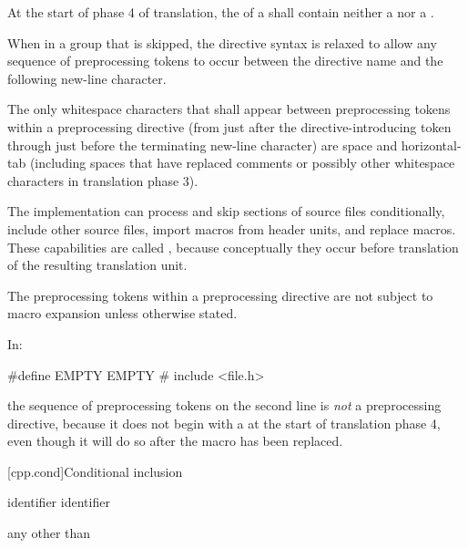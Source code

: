 \pnum
At the start of phase 4 of translation,
the  of a  shall
contain neither a  nor a .

\pnum
When in a group that is skipped, the directive
syntax is relaxed to allow any sequence of preprocessing tokens to occur between
the directive name and the following new-line character.

\pnum
The only whitespace characters that shall appear
between preprocessing tokens
within a preprocessing directive
(from just after the directive-introducing token
through just before the terminating new-line character)
are space and horizontal-tab
(including spaces that have replaced comments
or possibly other whitespace characters
in translation phase 3).

\pnum
The implementation can
process and skip sections of source files conditionally,
include other source files,
import macros from header units,
and replace macros.
These capabilities are called
,
because conceptually they occur
before translation of the resulting translation unit.

\pnum
The preprocessing tokens within a preprocessing directive
are not subject to macro expansion unless otherwise stated.

\begin{example}
In:
\begin{codeblock}
#define EMPTY
EMPTY   #   include <file.h>
\end{codeblock}
the sequence of preprocessing tokens on the second line is \textit{not}
a preprocessing directive, because it does not begin with a \tcode{\#} at the start of
translation phase 4, even though it will do so after the macro 
has been replaced.
\end{example}

[cpp.cond]{Conditional inclusion}%
%

%
\begin{bnf}
\br
     identifier\br
     identifier \terminal{)}
\end{bnf}

\begin{bnf}
\br
    \textnormal{any  other than \terminal{>}}
\end{bnf}


